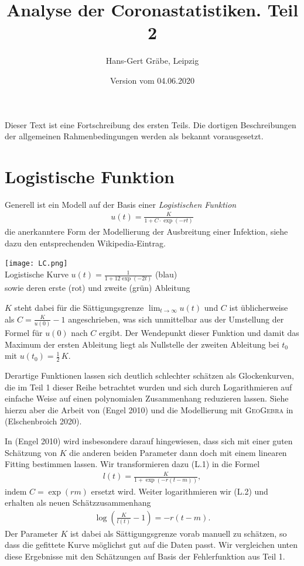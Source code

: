 \documentclass[a4paper,11pt]{article}
\title{Analyse der Coronastatistiken. Teil 2}
\author{Hans-Gert Gräbe, Leipzig}
\date{Version vom 04.06.2020}
\newcommand{\br}[1]{\left(#1\right)}
\newcommand{\m}{\cdot}
\begin{document}
\maketitle

Dieser Text ist eine Fortschreibung des ersten Teils. Die dortigen
Beschreibungen der allgemeinen Rahmenbedingungen werden als bekannt
vorausgesetzt. 

\section{Logistische Funktion}

Generell ist ein Modell auf der Basis einer \emph{Logistischen Funktion}
\begin{gather*}
  u(t)=\frac{K}{1+C\m\exp(-rt)}\tag{L.1}
\end{gather*}
die anerkanntere Form der Modellierung der Ausbreitung einer Infektion, siehe
dazu den entsprechenden Wikipedia-Eintrag. 
\begin{center}
  \texttt{[image: LC.png]}\\[1em] {Logistische Kurve
    $u(t)=\frac{1}{1+12\exp(-2t)}$ (blau)\\ sowie deren erste (rot) und zweite
    (grün) Ableitung}
\end{center}
$K$ steht dabei für die Sättigungsgrenze $\lim_{t\to\infty}{u(t)}$ und $C$ ist
üblicherweise als $C=\frac{K}{u(0)}-1$ angeschrieben, was sich unmittelbar aus
der Umstellung der Formel für $u(0)$ nach $C$ ergibt. Der Wendepunkt dieser
Funktion und damit das Maximum der ersten Ableitung liegt als Nullstelle der
zweiten Ableitung bei $t_0$ mit $u(t_0)=\frac12\,K$. 

Derartige Funktionen lassen sich deutlich schlechter schätzen als
Glockenkurven, die im Teil 1 dieser Reihe betrachtet wurden und sich durch
Logarithmieren auf einfache Weise auf einen polynomialen Zusammenhang
reduzieren lassen.  Siehe hierzu aber die Arbeit von (Engel 2010) und die
Modellierung mit \textsc{GeoGebra} in (Elschenbroich 2020).

In (Engel 2010) wird insbesondere darauf hingewiesen, dass sich mit einer
guten Schätzung von $K$ die anderen beiden Parameter dann doch mit einem
linearen Fitting bestimmen lassen.  Wir transformieren dazu (L.1) in die
Formel 
\begin{gather*}
  l(t)=\frac{K}{1+\exp(-r(t-m))},\tag{L.2}
\end{gather*}
indem $C=\exp(r m)$ ersetzt wird.  Weiter logarithmieren wir (L.2) und
erhalten als neuen Schätzzusammenhang
\begin{gather*}
  \log\br{\frac{K}{l(t)}-1}=-r(t-m).  \tag{L.3}
\end{gather*}
Der Parameter $K$ ist dabei als Sättigungsgrenze vorab manuell zu schätzen, so
dass die gefittete Kurve möglichst gut auf die Daten passt.  Wir vergleichen
unten diese Ergebnisse mit den Schätzungen auf Basis der Fehlerfunktion aus
Teil 1.
\end{document}
